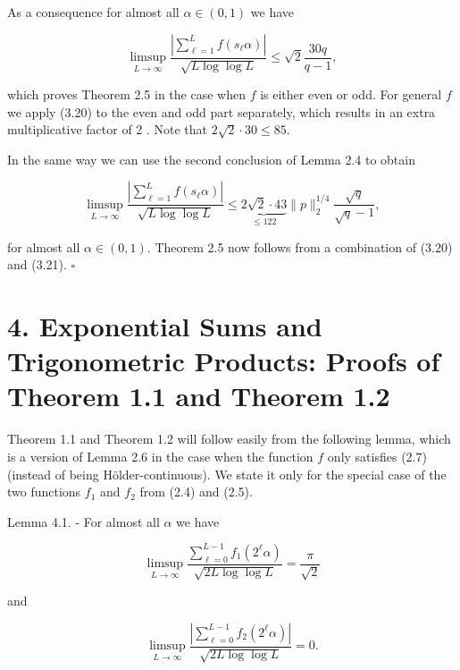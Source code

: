 \documentclass[10pt]{article}
\begin{document}
As a consequence for almost all $\alpha \in(0,1)$ we have


\begin{equation*}
\limsup _{L \rightarrow \infty} \frac{\left|\sum_{\ell=1}^{L} f\left(s_{\ell} \alpha\right)\right|}{\sqrt{L \log \log L}} \leqslant \sqrt{2} \frac{30 q}{q-1}, \tag{3.20}
\end{equation*}


which proves Theorem 2.5 in the case when $f$ is either even or odd. For general $f$ we apply (3.20) to the even and odd part separately, which results in an extra multiplicative factor of 2 . Note that $2 \sqrt{2} \cdot 30 \leqslant 85$.

In the same way we can use the second conclusion of Lemma 2.4 to obtain


\begin{equation*}
\limsup _{L \rightarrow \infty} \frac{\left|\sum_{\ell=1}^{L} f\left(s_{\ell} \alpha\right)\right|}{\sqrt{L \log \log L}} \leqslant \underbrace{2 \sqrt{2} \cdot 43}_{\leqslant 122}\|p\|_{2}^{1 / 4} \frac{\sqrt{q}}{\sqrt{q}-1}, \tag{3.21}
\end{equation*}


for almost all $\alpha \in(0,1)$. Theorem 2.5 now follows from a combination of (3.20) and (3.21). \(\square\)

\section*{4. Exponential Sums and Trigonometric Products: Proofs of Theorem 1.1 and Theorem 1.2}
Theorem 1.1 and Theorem 1.2 will follow easily from the following lemma, which is a version of Lemma 2.6 in the case when the function $f$ only satisfies (2.7) (instead of being Hölder-continuous). We state it only for the special case of the two functions $f_{1}$ and $f_{2}$ from (2.4) and (2.5).

Lemma 4.1. - For almost all $\alpha$ we have

$$
\limsup _{L \rightarrow \infty} \frac{\sum_{\ell=0}^{L-1} f_{1}\left(2^{\ell} \alpha\right)}{\sqrt{2 L \log \log L}}=\frac{\pi}{\sqrt{2}}
$$

and

$$
\limsup _{L \rightarrow \infty} \frac{\left|\sum_{\ell=0}^{L-1} f_{2}\left(2^{\ell} \alpha\right)\right|}{\sqrt{2 L \log \log L}}=0 .
$$
\end{document}
